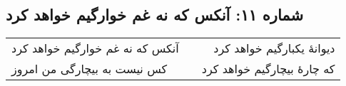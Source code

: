 \begin{center}
\section*{شماره ۱۱: آنکس که نه غم خوارگیم خواهد کرد}
\label{sec:011}
\begin{longtable}{l p{0.5cm} r}
آنکس که نه غم خوارگیم خواهد کرد
&&
دیوانهٔ یکبارگیم خواهد کرد
\\
کس نیست به بیچارگی من امروز
&&
که چارهٔ بیچارگیم خواهد کرد
\\
\end{longtable}
\end{center}
